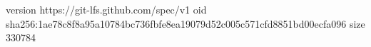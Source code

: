 version https://git-lfs.github.com/spec/v1
oid sha256:1ae78c8f8a95a10784bc736fbfe8ea19079d52c005c571cfd8851bd00ecfa096
size 330784
